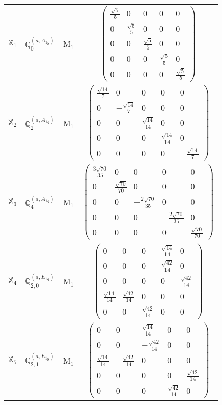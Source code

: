 \documentclass[fleqn,10pt,landscape]{article}
\begin{document}
\begin{itemize}
\begin{center}
\begin{longtable}{c|c|c|c}
$ \mathbb{X}_{1} $ & $\mathbb{Q}_{0}^{(a,A_{1g})}$ & M$_{1}$ & $\begin{pmatrix} \frac{\sqrt{5}}{5} & 0 & 0 & 0 & 0 \\ 0 & \frac{\sqrt{5}}{5} & 0 & 0 & 0 \\ 0 & 0 & \frac{\sqrt{5}}{5} & 0 & 0 \\ 0 & 0 & 0 & \frac{\sqrt{5}}{5} & 0 \\ 0 & 0 & 0 & 0 & \frac{\sqrt{5}}{5} \end{pmatrix}$ \\
$ \mathbb{X}_{2} $ & $\mathbb{Q}_{2}^{(a,A_{1g})}$ & M$_{1}$ & $\begin{pmatrix} \frac{\sqrt{14}}{7} & 0 & 0 & 0 & 0 \\ 0 & - \frac{\sqrt{14}}{7} & 0 & 0 & 0 \\ 0 & 0 & \frac{\sqrt{14}}{14} & 0 & 0 \\ 0 & 0 & 0 & \frac{\sqrt{14}}{14} & 0 \\ 0 & 0 & 0 & 0 & - \frac{\sqrt{14}}{7} \end{pmatrix}$ \\
$ \mathbb{X}_{3} $ & $\mathbb{Q}_{4}^{(a,A_{1g})}$ & M$_{1}$ & $\begin{pmatrix} \frac{3 \sqrt{70}}{35} & 0 & 0 & 0 & 0 \\ 0 & \frac{\sqrt{70}}{70} & 0 & 0 & 0 \\ 0 & 0 & - \frac{2 \sqrt{70}}{35} & 0 & 0 \\ 0 & 0 & 0 & - \frac{2 \sqrt{70}}{35} & 0 \\ 0 & 0 & 0 & 0 & \frac{\sqrt{70}}{70} \end{pmatrix}$ \\
$ \mathbb{X}_{4} $ & $\mathbb{Q}_{2,0}^{(a,E_{1g})}$ & M$_{1}$ & $\begin{pmatrix} 0 & 0 & 0 & \frac{\sqrt{14}}{14} & 0 \\ 0 & 0 & 0 & \frac{\sqrt{42}}{14} & 0 \\ 0 & 0 & 0 & 0 & \frac{\sqrt{42}}{14} \\ \frac{\sqrt{14}}{14} & \frac{\sqrt{42}}{14} & 0 & 0 & 0 \\ 0 & 0 & \frac{\sqrt{42}}{14} & 0 & 0 \end{pmatrix}$ \\
$ \mathbb{X}_{5} $ & $\mathbb{Q}_{2,1}^{(a,E_{1g})}$ & M$_{1}$ & $\begin{pmatrix} 0 & 0 & \frac{\sqrt{14}}{14} & 0 & 0 \\ 0 & 0 & - \frac{\sqrt{42}}{14} & 0 & 0 \\ \frac{\sqrt{14}}{14} & - \frac{\sqrt{42}}{14} & 0 & 0 & 0 \\ 0 & 0 & 0 & 0 & \frac{\sqrt{42}}{14} \\ 0 & 0 & 0 & \frac{\sqrt{42}}{14} & 0 \end{pmatrix}$ \\

\end{longtable}
\end{center}
\end{itemize}
\end{document}
